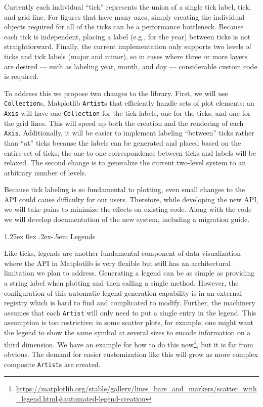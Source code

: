\documentclass[12pt]{article}
\makeatletter
\numberwithin{page}{section}
\renewcommand{\paragraph}{%
  \@startsection{paragraph}{4}%
  {\z@}{1.25ex \@plus 0ex \@minus .2ex}{-.5em}%
  {\normalfont\normalsize\itshape\bfseries}%
}
\makeatother
\begin{document}
Currently each individual ``tick''
represents the union of a single tick label, tick, and grid line.  For
figures that have many axes, simply creating the individual objects required
for all of the ticks can be a performance bottleneck.
Because each tick is independent, placing a label (e.g., for the year) between
ticks is not straightforward.  Finally, the current implementation only supports
two levels of ticks and tick labels (major and minor), so in cases where three or
more layers are desired ---
such as labeling year, month, and day --- considerable custom code is required.

To address this we propose two changes to the library.  First, we will use
\texttt{Collection}s, Matplotlib \texttt{Artist}s that efficiently handle sets of plot
elements: an \texttt{Axis} will have one \texttt{Collection} for the tick labels, one for the
ticks, and one for the grid lines.  This will speed up both the creation and
the rendering of each \texttt{Axis}.
Additionally, it will be easier to implement
labeling ``between'' ticks rather than ``at'' ticks because the labels can be
generated and placed based on the entire set of ticks; the one-to-one
correspondence between ticks and labels will be relaxed.
The second change is to generalize
the current two-level system to an arbitrary number of levels.

Because tick labeling is so fundamental to plotting, even small changes to the
API could cause difficulty for our users. Therefore, while developing the
new API, we will take pains to minimize the effects on existing code. Along with the code we will
develop documentation of the new system, including a migration guide.

\paragraph{Legends}

Like ticks, legends are another fundamental component of data
visualization where the API in Matplotlib is very flexible but still has
an architectural limitation we plan to address.
Generating a legend can be as simple as providing a string label when plotting and
then calling a single method.  However, the configuration of this automatic
legend generation capability is in an external registry which is hard to find
and complicated to modify.  Further, the machinery assumes that
each \texttt{Artist} will only need to put a single entry in the legend.  This
assumption is too restrictive; in
some scatter plots, for example, one might want the legend to show the same
symbol at several
sizes
to encode information on a third dimension. We have an example for how to do
this
now\footnote{\url{https://matplotlib.org/stable/gallery/lines_bars_and_markers/scatter_with_legend.html\#automated-legend-creation}},
but it is far from obvious.
The demand for easier customization like this will grow as more complex
composite \texttt{Artist}s are created.
\end{document}
